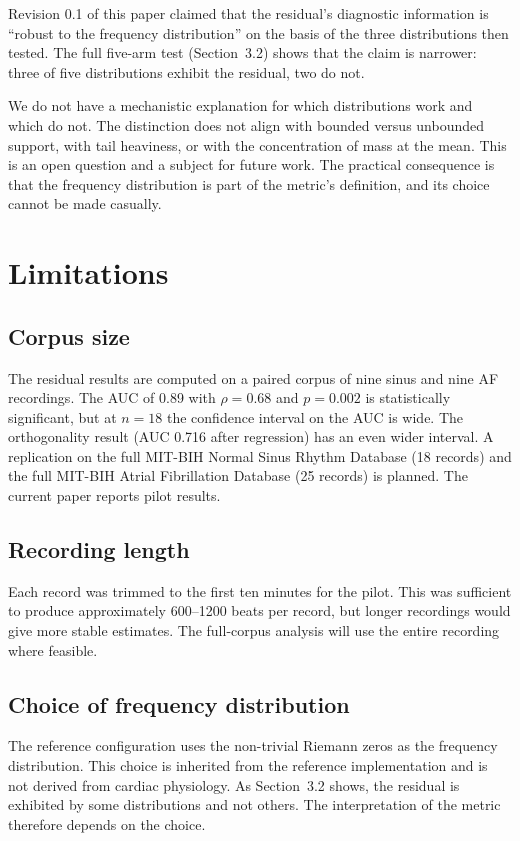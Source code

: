 \documentclass[11pt]{article}
\begin{document}
Revision 0.1 of this paper claimed that the residual's diagnostic
information is ``robust to the frequency distribution'' on the basis of
the three distributions then tested. The full five-arm test
(Section~3.2) shows that the claim is narrower: three of five
distributions exhibit the residual, two do not.

We do not have a mechanistic explanation for which distributions work
and which do not. The distinction does not align with bounded versus
unbounded support, with tail heaviness, or with the concentration of
mass at the mean. This is an open question and a subject for future
work. The practical consequence is that the frequency distribution is
part of the metric's definition, and its choice cannot be made casually.

\section{Limitations}

\subsection{Corpus size}

The residual results are computed on a paired corpus of nine sinus and
nine AF recordings. The AUC of 0.89 with $\rho = 0.68$ and $p = 0.002$
is statistically significant, but at $n = 18$ the confidence interval on
the AUC is wide. The orthogonality result (AUC 0.716 after regression)
has an even wider interval. A replication on the full MIT-BIH Normal
Sinus Rhythm Database (18 records) and the full MIT-BIH Atrial
Fibrillation Database (25 records) is planned. The current paper reports
pilot results.

\subsection{Recording length}

Each record was trimmed to the first ten minutes for the pilot. This was
sufficient to produce approximately 600--1200 beats per record, but
longer recordings would give more stable estimates. The full-corpus
analysis will use the entire recording where feasible.

\subsection{Choice of frequency distribution}

The reference configuration uses the non-trivial Riemann zeros as the
frequency distribution. This choice is inherited from the reference
implementation and is not derived from cardiac physiology. As
Section~3.2 shows, the residual is exhibited by some distributions and
not others. The interpretation of the metric therefore depends on the
choice.
\end{document}

